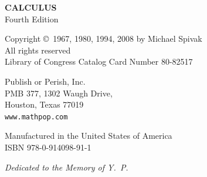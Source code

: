 %
\thispagestyle{empty}

\begin{center}
  {\Large\bfseries CALCULUS}\\[0.5em]
  Fourth Edition
\end{center}

\vspace{3em}

\begin{center}
  Copyright \copyright\ 1967, 1980, 1994, 2008 by Michael Spivak\\
  All rights reserved\\
  Library of Congress Catalog Card Number 80-82517
\end{center}

\vspace{3em}

\begin{center}
  Publish or Perish, Inc.\\
  PMB 377, 1302 Waugh Drive,\\
  Houston, Texas 77019\\
  \texttt{www.mathpop.com}
\end{center}

\vspace{3em}

\begin{center}
  Manufactured in the United States of America\\
  ISBN 978-0-914098-91-1
\end{center}

\vfill

\begin{center}
  \itshape Dedicated to the Memory of Y.~P.
\end{center}

\clearpage
